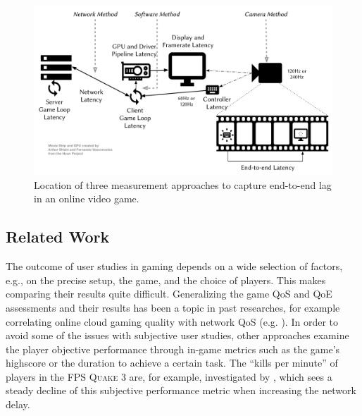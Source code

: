 \begin{figure}[!t]
    \centering
    \includegraphics[width=1.0\columnwidth]{../../../models/e2e-lag.pdf}
    \caption{Location of three measurement approaches to capture end-to-end lag in an online video game.}
\label{fig:measurement-methods}
\end{figure}






\subsection{Related Work}
\label{sec:relatedwork}

The outcome of user studies in gaming depends on a wide selection of factors, e.g., on the precise setup, the game, and the choice of players. This makes comparing their results quite difficult. Generalizing the game \acrshort{QoS} and \gls{QoE} assessments and their results has been a topic in past researches, for example correlating online cloud gaming quality with network \acrshort{QoS} (e.g. \cite{5976180}). In order to avoid some of the issues with subjective user studies, other approaches examine the player objective performance through in-game metrics such as the game's highscore or the duration to achieve a certain task. The ``kills per minute'' of players in the \gls{FPS} \textsc{Quake 3} are, for example, investigated by \cite{1266180}, which sees a steady decline of this subjective performance metric when increasing the network delay.






